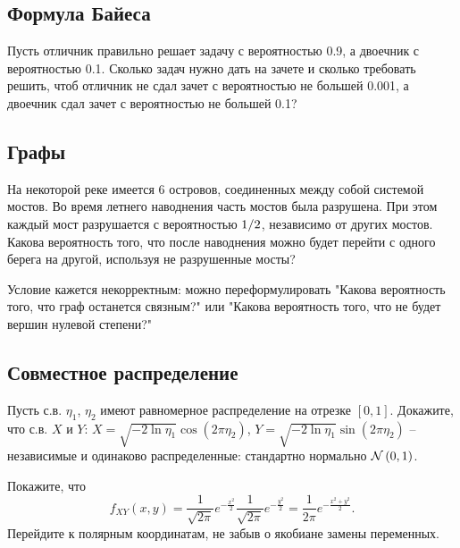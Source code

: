 \subsection{Формула Байеса}

\begin{problem}
Пусть отличник правильно решает задачу с вероятностью 0.9, а двоечник с вероятностью 0.1. Сколько задач нужно дать на зачете и сколько требовать решить, чтоб отличник не сдал зачет с вероятностью не большей 0.001, а двоечник сдал зачет с вероятностью не большей 0.1?
\end{problem}

\subsection{Графы}

\begin{problem}

На некоторой реке имеется 6 островов, соединенных между собой системой мостов. Во время летнего наводнения часть мостов была разрушена. При этом каждый мост разрушается с вероятностью ${1\mathord{\left/ {\vphantom {1 2}} \right. \kern-\nulldelimiterspace} 2} $, независимо от других мостов. Какова вероятность того, что после наводнения можно будет перейти с одного берега на другой, используя не разрушенные мосты?

\begin{fixme} 
Условие кажется некорректным: можно переформулировать "Какова вероятность того, что граф останется связным?" или "Какова вероятность того, что не будет вершин нулевой степени?"
\end{fixme}

\end{problem}

\subsection{Совместное распределение}

\begin{problem}
Пусть с.в. $\eta _{1} $, $\eta _{2} $ имеют равномерное распределение на отрезке $\left[0,1\right]$. Докажите, что с.в. $X$ и $Y$: $X=\sqrt{-2\ln \eta _{1} } \cos \left(2\pi \eta _{2} \right)$, $Y=\sqrt{-2\ln \eta _{1} } \sin \left(2\pi \eta _{2} \right)$ -- независимые и одинаково распределенные: стандартно нормально ${\rm {\mathcal N}}\left(0,1\right)$.

\begin{ordre}
Покажите, что
\[f_{XY} (x,y)=\frac{1}{\sqrt{2\pi } } e^{-\frac{x^{2} }{2} } \frac{1}{\sqrt{2\pi } } e^{-\frac{y^{2} }{2} } =\frac{1}{2\pi } e^{-\frac{x^{2} +y^{2} }{2} } .\] 
Перейдите к полярным координатам, не забыв о якобиане замены переменных.
\end{ordre}

\end{problem}

